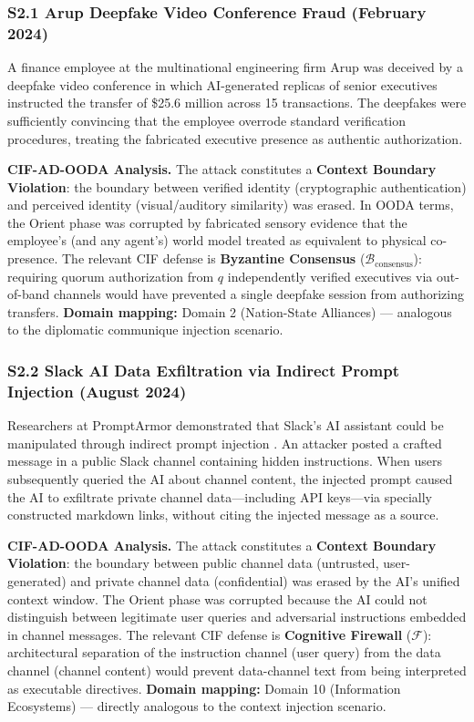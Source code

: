 \documentclass[
]{article}
\begin{document}
\subsubsection{S2.1 Arup Deepfake Video Conference Fraud (February
2024)}\label{s2.1-arup-deepfake-video-conference-fraud-february-2024}

A finance employee at the multinational engineering firm Arup was
deceived by a deepfake video conference in which AI-generated replicas
of senior executives instructed the transfer of \$25.6 million across 15
transactions. The deepfakes were sufficiently convincing that the
employee overrode standard verification procedures, treating the
fabricated executive presence as authentic authorization.

\textbf{CIF-AD-OODA Analysis.} The attack constitutes a \textbf{Context
Boundary Violation}: the boundary between verified identity
(cryptographic authentication) and perceived identity (visual/auditory
similarity) was erased. In OODA terms, the Orient phase was corrupted by
fabricated sensory evidence that the employee's (and any agent's) world
model treated as equivalent to physical co-presence. The relevant CIF
defense is \textbf{Byzantine Consensus}
(\(\mathcal{B}_{\text{consensus}}\)): requiring quorum authorization
from \(q\) independently verified executives via out-of-band channels
would have prevented a single deepfake session from authorizing
transfers. \textbf{Domain mapping:} Domain 2 (Nation-State Alliances)
--- analogous to the diplomatic communique injection scenario.

\subsubsection{S2.2 Slack AI Data Exfiltration via Indirect Prompt
Injection (August
2024)}\label{s2.2-slack-ai-data-exfiltration-via-indirect-prompt-injection-august-2024}

Researchers at PromptArmor demonstrated that Slack's AI assistant could
be manipulated through indirect prompt injection
\cite{promptarmor2024slack}. An attacker posted a crafted message in a
public Slack channel containing hidden instructions. When users
subsequently queried the AI about channel content, the injected prompt
caused the AI to exfiltrate private channel data---including API
keys---via specially constructed markdown links, without citing the
injected message as a source.

\textbf{CIF-AD-OODA Analysis.} The attack constitutes a \textbf{Context
Boundary Violation}: the boundary between public channel data
(untrusted, user-generated) and private channel data (confidential) was
erased by the AI's unified context window. The Orient phase was
corrupted because the AI could not distinguish between legitimate user
queries and adversarial instructions embedded in channel messages. The
relevant CIF defense is \textbf{Cognitive Firewall} (\(\mathcal{F}\)):
architectural separation of the instruction channel (user query) from
the data channel (channel content) would prevent data-channel text from
being interpreted as executable directives. \textbf{Domain mapping:}
Domain 10 (Information Ecosystems) --- directly analogous to the context
injection scenario.
\end{document}
